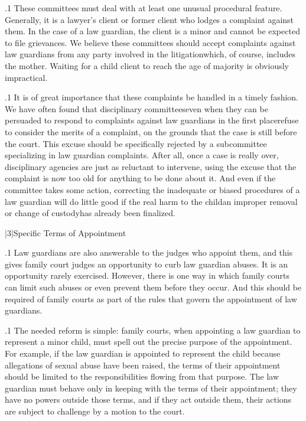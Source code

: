 \documentclass[11pt, twoside]{article}
\begin{document}
{\p.1{%
These committees must deal with at least one unusual procedural
feature. Generally, it is a lawyer’s client or former client who lodges
a complaint against them. In the case of a law guardian, the client is
a minor and cannot be expected to file grievances. We believe these
committees should accept complaints against law guardians from any
party involved in the litigation\mdash{}which, of course, includes the mother.
Waiting for a child client to reach the age of majority is obviously
impractical.
}%

\p.1{%
It is of great importance that these complaints be handled in a timely
fashion. We have often found that disciplinary committees\mdash{}even when
they can be persuaded to respond to complaints against law guardians
in the first place\mdash{}refuse to consider the merits of a complaint, on the
grounds that the case is still before the court. This excuse should be
specifically rejected by a subcommittee specializing in law guardian
complaints. After all, once a case is really over, disciplinary agencies are
just as reluctant to intervene, using the excuse that the complaint is now
too old for anything to be done about it. And even if the committee takes
some action, correcting the inadequate or biased procedures of a law
guardian will do little good if the real harm to the child\mdash{}an improper
removal or change of custody\mdash{}has already been finalized.
}%


\s|3|{Specific Terms of Appointment}

\p.1{%
\noindent{}Law guardians are also answerable to the judges who appoint them,
and this gives family court judges an opportunity to curb law guardian
abuses. It is an opportunity rarely exercised. However, there is one way
in which family courts can limit such abuses or even prevent them before they occur. And this should be required of family courts as part of
the rules that govern the appointment of law guardians.
}%

\p.1{%
The needed reform is simple: family courts, when appointing a law
guardian to represent a minor child, must spell out the precise purpose
of the appointment. For example, if the law guardian is appointed to represent the child because allegations of sexual abuse have been raised, the
terms of their appointment should be limited to the responsibilities flowing from that purpose. The law guardian must behave only in keeping
with the terms of their appointment; they have no powers outside those terms, and if they act outside them, their actions are subject
to challenge by a motion to the court.
}%

}
\end{document}
